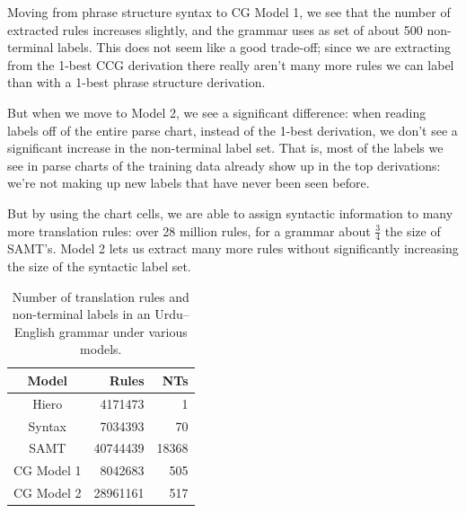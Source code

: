 \documentclass{article}
\begin{document}
Moving from phrase structure syntax to CG Model 1, we see that the number of extracted rules increases slightly, and the grammar uses as set of about 500 non-terminal labels. This does not seem like a good trade-off; since we are extracting from the 1-best CCG derivation there really aren't many more rules we can label than with a 1-best phrase structure derivation.

But when we move to Model 2, we see a significant difference: when reading labels off of the entire parse chart, instead of the 1-best derivation, we don't see a significant increase in the non-terminal label set. That is, most of the labels we see in parse charts of the training data already show up in the top derivations: we're not making up new labels that have never been seen before.

But by using the chart cells, we are able to assign syntactic information to many more translation rules: over 28 million rules, for a grammar about $\frac{3}{4}$ the size of SAMT's. Model 2 lets us extract many more rules without significantly increasing the size of the syntactic label set.

\begin{table}
\centering
\begin{tabular}{|c|r|r|}
\hline
Model & Rules & NTs\\
\hline
Hiero & 4171473 & 1\\
Syntax & 7034393 & 70\\
SAMT & 40744439 & 18368\\
CG Model 1 & 8042683 & 505\\
CG Model 2 & 28961161 & 517\\
\hline
\end{tabular}
\caption{Number of translation rules and non-terminal labels in an Urdu--English grammar under various models.\label{table:rule-count}}
\end{table}

\end{document}
